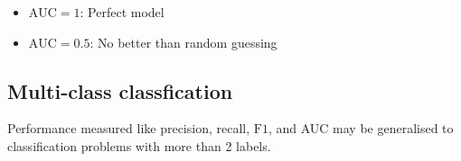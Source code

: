 \begin{itemize}
    \item \textbf{$\text{AUC} = 1$}: Perfect model
    \item \textbf{$\text{AUC} = 0.5$}: No better than random guessing
\end{itemize}

\subsection{Multi-class classfication}

\indent 

Performance measured like precision, recall, $\text{F1}$, and AUC may be generalised to classification problems with more than 2 labels.